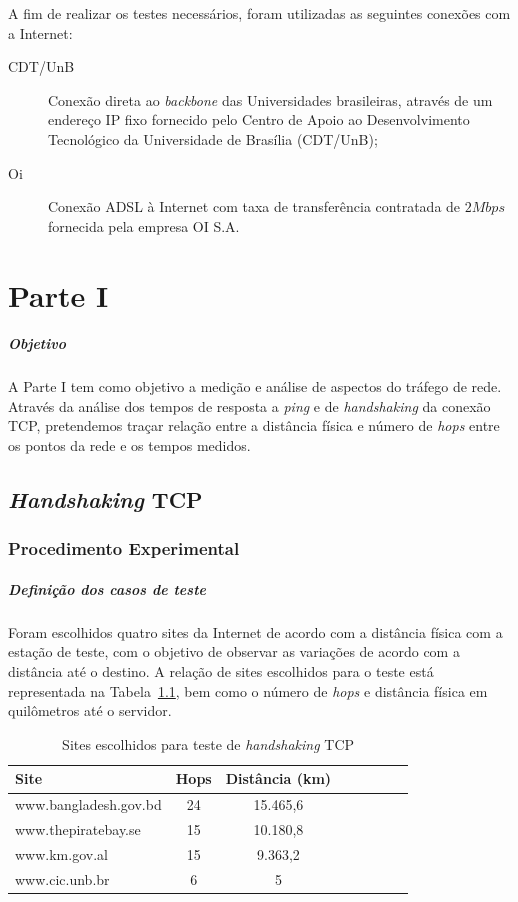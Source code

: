\documentclass[12pt,a4paper]{report}
\begin{document}
A fim de realizar os testes necessários, foram utilizadas as seguintes conexões com a Internet:

\begin{description}
\item[CDT/UnB] Conexão direta ao \textit{backbone} das Universidades brasileiras, através de um endereço IP fixo fornecido pelo Centro de Apoio ao Desenvolvimento Tecnológico da Universidade de Brasília (CDT/UnB);
\item[Oi] Conexão ADSL à Internet com taxa de transferência contratada de \(2Mbps\) fornecida pela empresa OI S.A.
\end{description}

\chapter{Parte I}

\paragraph{Objetivo} A Parte I tem como objetivo a medição e análise de aspectos do tráfego de rede. Através da análise dos tempos de resposta a \textit{ping} e de \textit{handshaking} da conexão TCP, pretendemos traçar relação entre a distância física e número de \textit{hops} entre os pontos da rede e os tempos medidos.

\section{\textit{Handshaking} TCP}

\subsection{Procedimento Experimental}

\paragraph{Definição dos casos de teste} Foram escolhidos quatro sites da Internet de acordo com a distância física com a estação de teste, com o objetivo de observar as variações de acordo com a distância até o destino. A relação de sites escolhidos para o teste está representada na Tabela~\ref{tab:siteshandshaking}, bem como o número de \textit{hops} e distância física em quilômetros até o servidor.

\begin{table}[h]
	\center
	\begin{tabular}{l*{6}{c}r}
	Site						& Hops	& Distância (km)\\
	\hline
	www.bangladesh.gov.bd		& 24		& 15.465,6\\
	www.thepiratebay.se		& 15		& 10.180,8\\
	www.km.gov.al				& 15		& 9.363,2\\
	www.cic.unb.br				& 6		& 5\\
	\end{tabular}
	\caption{Sites escolhidos para teste de \textit{handshaking} TCP}
	\label{tab:siteshandshaking}
\end{table}
\end{document}
